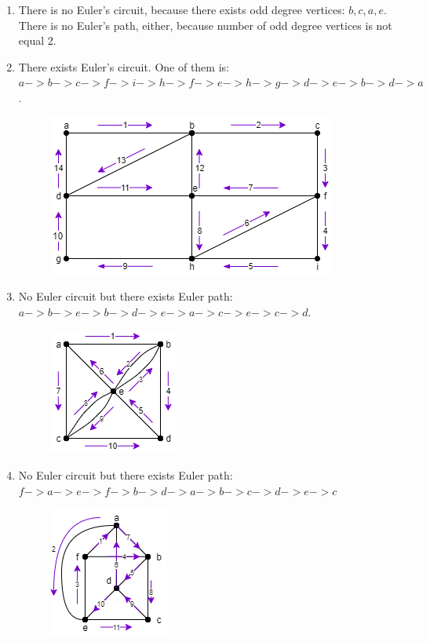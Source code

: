 \documentclass[a4paper]{article}
\begin{document}
	\begin{enumerate}[label = \alph*)]
	    \item There is no Euler's circuit, because there exists odd degree vertices: $b, c, a, e$. \\
	    There is no Euler's path, either, because number of odd degree vertices is not equal 2.
	    \item There exists Euler's circuit. One of them is: $a -> b -> c -> f -> i -> h -> f -> e -> h -> g -> d -> e -> b -> d -> a$.
	    \begin{figure}[H]
	        \centering
	        \includegraphics[width= 0.5 \textwidth]{tut912_7.png}
	    \end{figure}
	    \item No Euler circuit but there exists Euler path: $a -> b -> e -> b ->d -> e -> a -> c -> e -> c ->d$.
	    \begin{figure}[H]
	        \centering
	        \includegraphics[width= 0.3 \textwidth]{tut912_8.png}
	    \end{figure}
	    \item No Euler circuit but there exists Euler path: $f -> a -> e -> f -> b ->d -> a -> b -> c -> d -> e ->c$
	    \begin{figure}[H]
	        \centering
	        \includegraphics[width= 0.3 \textwidth]{tut912_9.png}

\end{figure}
\end{enumerate}
\end{document}

